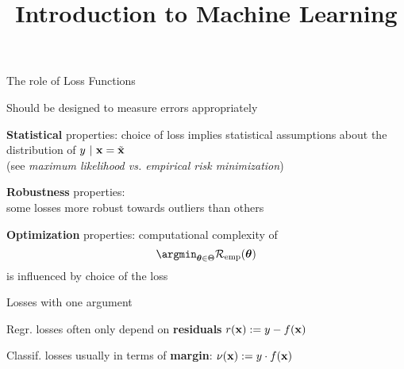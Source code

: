 \documentclass[11pt,compress,t,notes=noshow, xcolor=table]{beamer}
\title{Introduction to Machine Learning}
\begin{document}
    

\begin{framei}[sep=L]{The role of Loss Functions}

\item Should be designed to measure errors appropriately

\item \textbf{Statistical} properties: choice of loss implies statistical assumptions about the distribution of $y ~|~ \mathbf{x} = \tilde{\mathbf{x}}$ \\
(see \emph{maximum likelihood vs. empirical risk minimization})
\item \textbf{Robustness} properties: \\
some losses more robust towards outliers than others
\item \textbf{Optimization} properties: computational complexity of
$$
\argmint \risket
$$
is influenced by choice of the loss 


\end{framei}



\begin{framei}[sep=M]{Losses with one argument}


\item Regr. losses often only depend on  \textbf{residuals} 
$r(\mathbf{x}) := y - f(\mathbf{x})$

\item Classif. losses usually in terms of 
  \textbf{margin}: $\nu(\mathbf{x}) := y \cdot f(\mathbf{x})$

\vfill


\end{framei}
\end{document}
